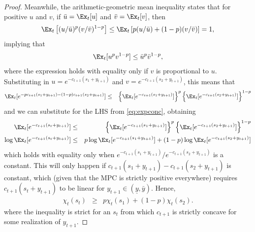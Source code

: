\documentclass[titlepage]{\econtex}
\begin{document}
\begin{proof}
    Meanwhile, the arithmetic-geometric mean inequality states that for positive $u$ and $v$, if $\bar u = \Ex_t [ u]$ and $\bar v = \Ex_t [ v]$, then
    \begin{equation*}
      \Ex_t\left[( u/\bar u)^p ( v/\bar v)^{1-p}\right] 
      \leq \Ex_t \left[p ( u/\bar u)+(1-p)( v/\bar v)\right] = 1, 
    \end{equation*}
    implying that 
    \begin{equation*}
      \Ex_t [ u^p  v^{1-p}] \leq \bar u^p \bar v^{1-p}, 
    \end{equation*}
    where the expression holds with equality only if $v$ is proportional to $u$.  Substituting in $u= e^{-c_{t+1}(s_1 + {y}_{t+1})}$ and $v = e^{-c_{t+1}(s_2 + {y}_{t+1})}$, this means that
    \begin{eqnarray*}
      \Ex_t [e^{-p c_{t+1}(s_1 + {y}_{t+1}) - (1-p)c_{t+1}(s_2 + {y}_{t+1})}] & \leq &
                                                                                       \left\{ \Ex_t  [e^{- c_{t+1}(s_1 + {y}_{t+1})} ] \right\}^p \left\{ \Ex_t  [e^{- c_{t+1}(s_2 + {y}_{t+1})} ] \right\}^{1-p}
    \end{eqnarray*}
    and we can substitute for the LHS from \eqref{eq:expconc}, obtaining
    \begin{eqnarray}
      \Ex_{t}[e^{-c_{t+1}(s_{t}+{y}_{t+1})}] & \leq &
                                                      \left\{ \Ex_t  [e^{- c_{t+1}(s_1 + {y}_{t+1})} ] \right\}^p 	\left\{ \Ex_t  [e^{- c_{t+1}(s_2 + {y}_{t+1})} ] \right\}^{1-p} \nonumber
      \\ 
      \log \Ex_{t}[e^{-c_{t+1}(s_{t}+{y}_{t+1})}] &\leq &
                                                          p \log \Ex_t  [e^{-c_{t+1}(s_1 + {y}_{t+1})} ] 
                                                          + (1-p) \log \Ex_t  [e^{-c_{t+1}(s_2 + {y}_{t+1})} ]  \label{eq:expineq2} 
    \end{eqnarray}
    which holds with equality only when $e^{-c_{t+1}(s_{1}+{y}_{t+1})}/e^{-c_{t+1}(s_{2}+{y}_{t+1})}$ is a constant. This will only happen if 	$c_{t+1}(s_{1}+{y}_{t+1})-c_{t+1}(s_{2}+{y}_{t+1})$ is constant, which (given that the MPC is strictly positive everywhere) requires 	$c_{t+1}(s_{t}+{y}_{t+1})$ to be linear for ${y}_{t+1} \in (\underline{y},\bar{y})$. Hence, 
    \begin{eqnarray*}
      \chi_{t}(s_t) & \geq & p \chi_{t}(s_{1}) + (1-p) \chi_{t}(s_{2}).
    \end{eqnarray*}
    where the inequality is strict for an $s_{t}$ from which $c_{t+1}$ is strictly concave for some realization of ${y}_{t+1}$.
    

\end{proof}
\end{document}

